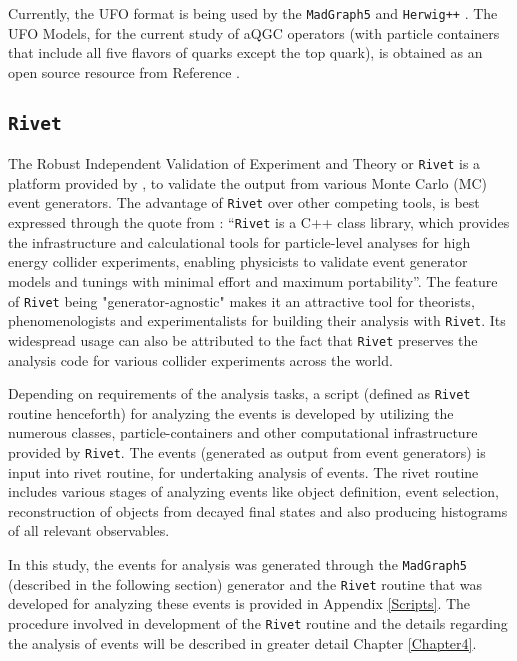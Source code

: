 Currently, the UFO format is being used by the \texttt{MadGraph5} \cite{MG5} and \texttt{Herwig++} \cite{Bellm:2015jjp}. The UFO Models, for the current study of aQGC operators (with particle containers that include all five flavors of quarks except the top quark), is obtained as an open source resource from Reference \cite{aQGC}. 

\subsection{\texttt{Rivet}}\label{Rivet}
The Robust Independent Validation of Experiment and Theory or \texttt{Rivet} is a platform provided by \cite{RivetHomePage}, \cite{Buckley:2010ar} to validate the output from various Monte Carlo (MC) event generators. The advantage of \texttt{Rivet} over other competing tools, is best expressed through the quote from \cite{Buckley:2010ar}: ``\texttt{Rivet} is a C++ class library, which provides the infrastructure and calculational tools for particle-level analyses for high energy collider experiments, enabling physicists to validate event generator models and tunings with minimal effort and maximum portability''. The feature of \texttt{Rivet} being "generator-agnostic" \cite{Rivet-Tutorial} makes it an attractive tool for theorists, phenomenologists and experimentalists for building their analysis with \texttt{Rivet}.  Its widespread usage can also be attributed to the fact that \texttt{Rivet} preserves the analysis code for various collider experiments across the world.

Depending on requirements of the analysis tasks, a script (defined as \texttt{Rivet} routine henceforth) for analyzing the events is developed by utilizing the numerous classes, particle-containers and other computational infrastructure provided by \texttt{Rivet}. The events (generated as output from event generators) is input into rivet routine, for undertaking analysis of events. The rivet routine includes various stages of analyzing events like object definition, event selection, reconstruction of objects from decayed final states and also producing histograms of all relevant observables. 

In this study, the events for analysis was generated through the \texttt{MadGraph5} (described in the following section) generator and the \texttt{Rivet} routine that was developed for analyzing these events is provided in Appendix \ref{Scripts}. The procedure involved in development of the \texttt{Rivet} routine and the details regarding the analysis of events will be described in greater detail Chapter \ref{Chapter4}. %



